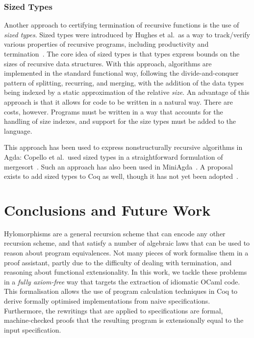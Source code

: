 \documentclass[ a4paper, UKenglish, cleveref, autoref, thm-restate]{lipics-v2021}
\begin{document}
\subsubsection{Sized Types}\label{sec:sizedT}

Another approach to certifying termination of recursive functions is the use of
\emph{sized types}. Sized types were introduced by Hughes et al.\ as a way to
track/verify various properties of recursive programs, including productivity
and termination~\cite{HughesPS96}. The core idea of sized types is that types
express bounds on the sizes of recursive data structures. With this approach,
algorithms are implemented in the standard functional way, following the
divide-and-conquer pattern of splitting, recurring, and merging, with the
addition of the data types being indexed by a static approximation of the
relative \emph{size}. An advantage of this approach is that it allows for code
to be written in a natural way. There are costs, however. Programs must be
written in a way that accounts for the handling of size indexes, and support for
the size types must be added to the language.

This approach has been used to express nonstructurally recursive
algorithms in Agda: Copello et al.\ used sized types in a straightforward
formulation of mergesort~\cite{CopelloTB14}. Such an approach has also been used
in MiniAgda~\cite{abs-1202-3496}. A proposal exists to add sized types to
Coq as well, though it has not yet been adopted~\cite{ChanLB23}.


\section{Conclusions and Future Work}

Hylomorphisms are a general recursion scheme that can encode any other
recursion scheme, and that satisfy a number of algebraic laws that can be used
to reason about program equivalences. Not many
pieces of work formalise them in a proof assistant, partly due to the
difficulty of dealing with termination, and reasoning about functional
extensionality. In this work, we tackle these problems in a \emph{fully
axiom-free} way that targets the extraction of idiomatic OCaml code.  This
formalisation allows the use of program calculation techniques in Coq to derive
formally optimised implementations from naive specifications. Furthermore, the
rewritings that are applied to specifications are formal, machine-checked
proofs that the resulting program is extensionally equal to the input
specification. 
\end{document}
